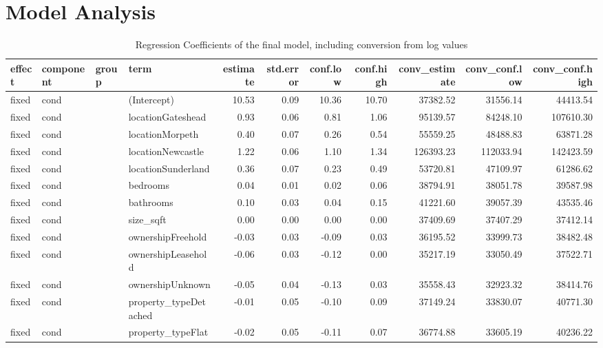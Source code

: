 \documentclass{scrartcl}
\begin{document}
\section{Model Analysis}
\begin{landscape}
	\begin{table}[ht]
		\centering
		\caption{Regression Coefficients of the final model, including conversion from log values} 
		\label{tab:regcoef}
		\begin{adjustbox}{max width=\linewidth}
		\begin{tabular}{llllrrrrrrr}
			\hline
			effect & component & group & term & estimate & std.error & conf.low & conf.high & conv\_estimate & conv\_conf.low & conv\_conf.high \\ 
			\hline
			fixed & cond &  & (Intercept) & 10.53 & 0.09 & 10.36 & 10.70 & 37382.52 & 31556.14 & 44413.54 \\ 
			fixed & cond &  & locationGateshead & 0.93 & 0.06 & 0.81 & 1.06 & 95139.57 & 84248.10 & 107610.30 \\ 
			fixed & cond &  & locationMorpeth & 0.40 & 0.07 & 0.26 & 0.54 & 55559.25 & 48488.83 & 63871.28 \\ 
			fixed & cond &  & locationNewcastle & 1.22 & 0.06 & 1.10 & 1.34 & 126393.23 & 112033.94 & 142423.59 \\ 
			fixed & cond &  & locationSunderland & 0.36 & 0.07 & 0.23 & 0.49 & 53720.81 & 47109.97 & 61286.62 \\ 
			fixed & cond &  & bedrooms & 0.04 & 0.01 & 0.02 & 0.06 & 38794.91 & 38051.78 & 39587.98 \\ 
			fixed & cond &  & bathrooms & 0.10 & 0.03 & 0.04 & 0.15 & 41221.60 & 39057.39 & 43535.46 \\ 
			fixed & cond &  & size\_sqft & 0.00 & 0.00 & 0.00 & 0.00 & 37409.69 & 37407.29 & 37412.14 \\ 
			fixed & cond &  & ownershipFreehold & -0.03 & 0.03 & -0.09 & 0.03 & 36195.52 & 33999.73 & 38482.48 \\ 
			fixed & cond &  & ownershipLeasehold & -0.06 & 0.03 & -0.12 & 0.00 & 35217.19 & 33050.49 & 37522.71 \\ 
			fixed & cond &  & ownershipUnknown & -0.05 & 0.04 & -0.13 & 0.03 & 35558.43 & 32923.32 & 38414.76 \\ 
			fixed & cond &  & property\_typeDetached & -0.01 & 0.05 & -0.10 & 0.09 & 37149.24 & 33830.07 & 40771.30 \\ 
			fixed & cond &  & property\_typeFlat & -0.02 & 0.05 & -0.11 & 0.07 & 36774.88 & 33605.19 & 40236.22 \\ 

\end{tabular}
\end{adjustbox}
\end{table}
\end{landscape}
\end{document}
